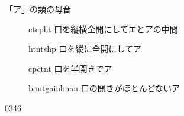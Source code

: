 \documentclass[aspectratio=169,xcolor={dvipsnames,table}]{beamer}
\begin{document}
\begin{frame}[plain]{「ア」の類の母音}
\Large

\hypertarget{today}{}

\begin{description}
 \item[\textipa{/\ae /}] ct\hspace{20pt}cp\hspace{20pt}ht%
\hfill{}{\small 口を縦横全開にしてエとアの中間}
 \item[\textipa{/\textscripta /}] ht\hspace{20pt}nt\hspace{20pt}shp%
\hfill{}{\small 口を縦に全開にしてア}
 \item[\textipa{/\textturnv /}] cp\hspace{20pt}ct\hspace{20pt}nt%
\hfill{}{\small 口を半開きでア}
 \item[\textipa{/\textschwa /}] bout\hspace{20pt}gain\hspace{20pt}bnan%
\hfill{}{\small 口の開きがほとんどないア}
 \end{description}

\hfill{\tiny 0346}\,{\scriptsize {}}

\hfill\hyperlink{ex}{}%

\end{frame}
\end{document}
